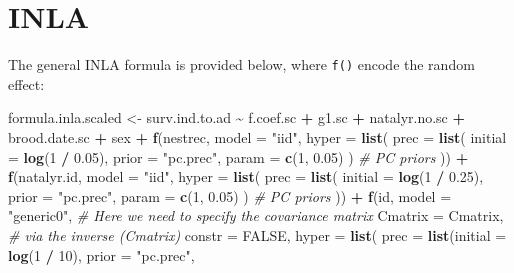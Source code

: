 \documentclass[
]{article}
\newenvironment{Shaded}{\begin{snugshade}}{\end{snugshade}}
\newcommand{\AttributeTok}[1]{\textcolor[rgb]{0.13,0.29,0.53}{#1}}
\newcommand{\CommentTok}[1]{\textcolor[rgb]{0.56,0.35,0.01}{\textit{#1}}}
\newcommand{\ConstantTok}[1]{\textcolor[rgb]{0.56,0.35,0.01}{#1}}
\newcommand{\DecValTok}[1]{\textcolor[rgb]{0.00,0.00,0.81}{#1}}
\newcommand{\FloatTok}[1]{\textcolor[rgb]{0.00,0.00,0.81}{#1}}
\newcommand{\FunctionTok}[1]{\textcolor[rgb]{0.13,0.29,0.53}{\textbf{#1}}}
\newcommand{\NormalTok}[1]{#1}
\newcommand{\OtherTok}[1]{\textcolor[rgb]{0.56,0.35,0.01}{#1}}
\newcommand{\SpecialCharTok}[1]{\textcolor[rgb]{0.81,0.36,0.00}{\textbf{#1}}}
\newcommand{\StringTok}[1]{\textcolor[rgb]{0.31,0.60,0.02}{#1}}
\begin{document}
\hypertarget{inla}{%
\section*{INLA}\label{inla}}

The general INLA formula is provided below, where \texttt{f()} encode
the random effect:

\begin{Shaded}
\begin{Highlighting}[]
\NormalTok{formula.inla.scaled }\OtherTok{\textless{}{-}}\NormalTok{ surv.ind.to.ad }\SpecialCharTok{\textasciitilde{}}\NormalTok{ f.coef.sc }\SpecialCharTok{+}\NormalTok{ g1.sc }\SpecialCharTok{+} 
\NormalTok{  natalyr.no.sc }\SpecialCharTok{+}\NormalTok{ brood.date.sc }\SpecialCharTok{+}\NormalTok{ sex }\SpecialCharTok{+}
  \FunctionTok{f}\NormalTok{(nestrec, }\AttributeTok{model =} \StringTok{"iid"}\NormalTok{, }\AttributeTok{hyper =} \FunctionTok{list}\NormalTok{(}
    \AttributeTok{prec =} \FunctionTok{list}\NormalTok{(}
      \AttributeTok{initial =} \FunctionTok{log}\NormalTok{(}\DecValTok{1} \SpecialCharTok{/} \FloatTok{0.05}\NormalTok{),}
      \AttributeTok{prior =} \StringTok{"pc.prec"}\NormalTok{,}
      \AttributeTok{param =} \FunctionTok{c}\NormalTok{(}\DecValTok{1}\NormalTok{, }\FloatTok{0.05}\NormalTok{)}
\NormalTok{    ) }\CommentTok{\# PC priors}
\NormalTok{  )) }\SpecialCharTok{+}
  \FunctionTok{f}\NormalTok{(natalyr.id, }\AttributeTok{model =} \StringTok{"iid"}\NormalTok{, }\AttributeTok{hyper =} \FunctionTok{list}\NormalTok{(}
    \AttributeTok{prec =} \FunctionTok{list}\NormalTok{(}
      \AttributeTok{initial =} \FunctionTok{log}\NormalTok{(}\DecValTok{1} \SpecialCharTok{/} \FloatTok{0.25}\NormalTok{),}
      \AttributeTok{prior =} \StringTok{"pc.prec"}\NormalTok{,}
      \AttributeTok{param =} \FunctionTok{c}\NormalTok{(}\DecValTok{1}\NormalTok{, }\FloatTok{0.05}\NormalTok{)}
\NormalTok{    ) }\CommentTok{\# PC priors}
\NormalTok{  )) }\SpecialCharTok{+}
  \FunctionTok{f}\NormalTok{(id,}
    \AttributeTok{model =} \StringTok{"generic0"}\NormalTok{, }\CommentTok{\# Here we need to specify the covariance matrix}
    \AttributeTok{Cmatrix =}\NormalTok{ Cmatrix, }\CommentTok{\#    via the inverse (Cmatrix)}
    \AttributeTok{constr =} \ConstantTok{FALSE}\NormalTok{,}
    \AttributeTok{hyper =} \FunctionTok{list}\NormalTok{(}
      \AttributeTok{prec =} \FunctionTok{list}\NormalTok{(}\AttributeTok{initial =} \FunctionTok{log}\NormalTok{(}\DecValTok{1} \SpecialCharTok{/} \DecValTok{10}\NormalTok{), }\AttributeTok{prior =} \StringTok{"pc.prec"}\NormalTok{,}

\end{Highlighting}
\end{Shaded}
\end{document}
